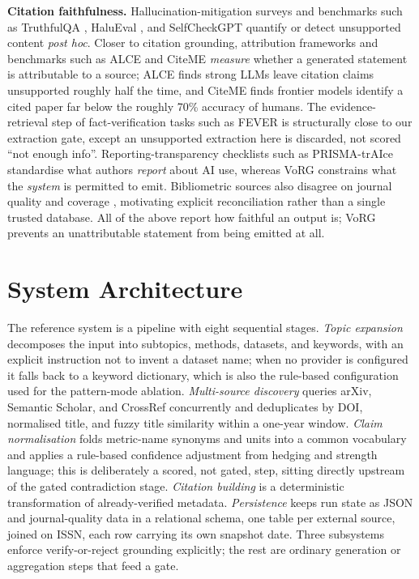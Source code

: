 \documentclass[conference]{IEEEtran}
\begin{document}
\textbf{Citation faithfulness.} Hallucination-mitigation surveys and benchmarks
such as TruthfulQA \cite{lin2022truthfulqa}, HaluEval \cite{li2023halueval}, and
SelfCheckGPT \cite{manakul2023selfcheckgpt} quantify or detect unsupported
content \emph{post hoc}. Closer to citation grounding, attribution frameworks
\cite{rashkin2023measuring,bohnet2022attributed} and benchmarks such as ALCE
\cite{gao2023enabling} and CiteME \cite{press2024citeme} \emph{measure} whether a
generated statement is attributable to a source; ALCE finds strong LLMs leave
citation claims unsupported roughly half the time, and CiteME finds frontier
models identify a cited paper far below the roughly 70\% accuracy of humans.
The evidence-retrieval step of fact-verification tasks such as FEVER
\cite{thorne2018fever} is structurally close to our extraction gate, except an
unsupported extraction here is discarded, not scored ``not enough info''.
Reporting-transparency checklists such as PRISMA-trAIce \cite{prismatraice2025}
standardise what authors \emph{report} about AI use, whereas VoRG constrains what
the \emph{system} is permitted to emit. Bibliometric sources also disagree on
journal quality and coverage \cite{machacek2022predatory,mongeon2016journal},
motivating explicit reconciliation rather than a single trusted database. All of
the above report how faithful an output is; VoRG prevents an unattributable
statement from being emitted at all.

\section{System Architecture}
The reference system is a pipeline with eight sequential stages. \emph{Topic
expansion} decomposes the input into subtopics, methods, datasets, and keywords,
with an explicit instruction not to invent a dataset name; when no provider is
configured it falls back to a keyword dictionary, which is also the rule-based
configuration used for the pattern-mode ablation. \emph{Multi-source discovery}
queries arXiv, Semantic Scholar, and CrossRef concurrently and deduplicates by
DOI, normalised title, and fuzzy title similarity within a one-year window.
\emph{Claim normalisation} folds metric-name synonyms and units into a common
vocabulary and applies a rule-based confidence adjustment from hedging and
strength language; this is deliberately a scored, not gated, step, sitting
directly upstream of the gated contradiction stage. \emph{Citation building} is a
deterministic transformation of already-verified metadata. \emph{Persistence}
keeps run state as JSON and journal-quality data in a relational schema, one
table per external source, joined on ISSN, each row carrying its own snapshot
date. Three subsystems enforce verify-or-reject grounding explicitly; the rest
are ordinary generation or aggregation steps that feed a gate.
\end{document}
